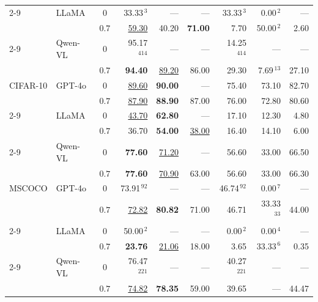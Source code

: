 \documentclass[10pt,twocolumn,letterpaper]{article}
\begin{document}
\begin{table}[t]
\begin{tabular}{@{}ll c rrrrrr@{}}
\cmidrule(l){2-9}
          & LLaMA    & $0$ &    33.33$^{\,3}$ &              --- &              --- &    33.33$^{\,3}$ &     0.00$^{\,2}$ &              --- \\
          &          & $0.7$ & \underline{59.30} &            40.20 &   \textbf{71.00} &             7.70 &    50.00$^{\,2}$ &             2.60 \\
\cmidrule(l){2-9}
          & Qwen-VL  & $0$ &  95.17$^{\,414}$ &              --- &              --- &  14.25$^{\,414}$ &              --- &              --- \\
          &          & $0.7$ &   \textbf{94.40} & \underline{89.20} &            86.00 &            29.30 &    7.69$^{\,13}$ &            27.10 \\
\midrule
CIFAR-10  & GPT-4o   & $0$ & \underline{89.60} &   \textbf{90.00} &              --- &            75.40 &            73.10 &            82.70 \\
          &          & $0.7$ & \underline{87.90} &   \textbf{88.90} &            87.00 &            76.00 &            72.80 &            80.60 \\
\cmidrule(l){2-9}
          & LLaMA    & $0$ & \underline{43.70} &   \textbf{62.80} &              --- &            17.10 &            12.30 &             4.80 \\
          &          & $0.7$ &            36.70 &   \textbf{54.00} & \underline{38.00} &            16.40 &            14.10 &             6.00 \\
\cmidrule(l){2-9}
          & Qwen-VL  & $0$ &   \textbf{77.60} & \underline{71.20} &              --- &            56.60 &            33.00 &            66.50 \\
          &          & $0.7$ &   \textbf{77.60} & \underline{70.90} &            63.00 &            56.60 &            33.00 &            66.30 \\
\midrule
MSCOCO    & GPT-4o   & $0$ &   73.91$^{\,92}$ &              --- &              --- &   46.74$^{\,92}$ &     0.00$^{\,7}$ &              --- \\
          &          & $0.7$ & \underline{72.82} &   \textbf{80.82} &            71.00 &            46.71 &   33.33$^{\,33}$ &            44.00 \\
\cmidrule(l){2-9}
          & LLaMA    & $0$ &    50.00$^{\,2}$ &              --- &              --- &     0.00$^{\,2}$ &     0.00$^{\,4}$ &              --- \\
          &          & $0.7$ &   \textbf{23.76} & \underline{21.06} &            18.00 &             3.65 &    33.33$^{\,6}$ &             0.35 \\
\cmidrule(l){2-9}
          & Qwen-VL  & $0$ &  76.47$^{\,221}$ &              --- &              --- &  40.27$^{\,221}$ &              --- &              --- \\
          &          & $0.7$ & \underline{74.82} &   \textbf{78.35} &            59.00 &            39.65 &              --- &            44.47 \\
\bottomrule
\end{tabular}
\end{table}
\end{document}
